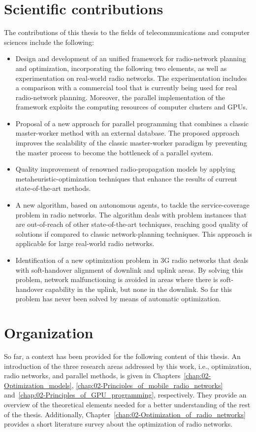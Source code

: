 \section{Scientific contributions}

The contributions of this thesis to the fields of telecommunications
and computer sciences include the following:
\begin{itemize}
\item Design and development of an unified framework for radio-network planning
and optimization, incorporating the following two elements, as well
as experimentation on real-world radio networks. The experimentation
includes a comparison with a commercial tool that is currently being
used for real radio-network planning. Moreover, the parallel implementation
of the framework exploits the computing resources of computer clusters
and GPUs.
\item Proposal of a new approach for parallel programming that combines
a classic master-worker method with an external database. The proposed
approach improves the scalability of the classic master-worker paradigm
by preventing the master process to become the bottleneck of a parallel
system.
\item Quality improvement of renowned radio-propagation models by applying
metaheuristic-optimization techniques that enhance the results of
current state-of-the-art methods.
\item A new algorithm, based on autonomous agents, to tackle the service-coverage
problem in radio networks. The algorithm deals with problem instances
that are out-of-reach of other state-of-the-art techniques, reaching
good quality of solutions if compared to classic network-planning
techniques. This approach is applicable for large real-world radio
networks.
\item Identification of a new optimization problem in 3G radio networks
that deals with soft-handover alignment of downlink and uplink areas.
By solving this problem, network malfunctioning is avoided in areas
where there is soft-handover capability in the uplink, but none in
the downlink. So far this problem has never been solved by means of
automatic optimization.
\end{itemize}

\section{Organization}

So far, a context has been provided for the following content of this
thesis. An introduction of the three research areas addressed by this
work, i.e., optimization, radio networks, and parallel methods, is
given in Chapters~\ref{chap:02-Optimization_models}, \ref{chap:02-Principles_of_mobile_radio_networks}
and~\ref{chap:02-Principles_of_GPU_programming}, respectively. They
provide an overview of the theoretical elements needed for a better
understanding of the rest of the thesis. Additionally, Chapter~\ref{chap:02-Optimization_of_radio_networks}
provides a short literature survey about the optimization of radio
networks. 

